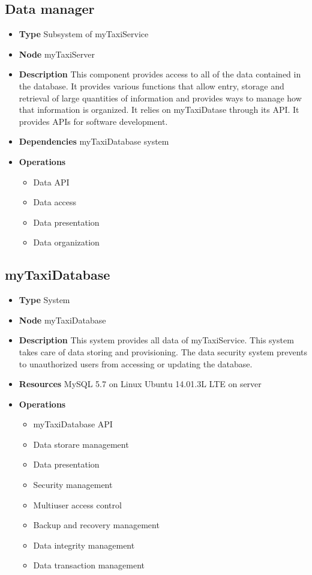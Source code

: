 \subsection{Data manager}
\begin{itemize}
	\item[]\textbf{Type} Subsystem of myTaxiService
	\item[]\textbf{Node} myTaxiServer
	\item[]\textbf{Description}  This component provides access to all of the data contained in the database. It provides various functions that allow entry, storage and retrieval of large quantities of information and provides ways to manage how that information is organized. It relies on myTaxiDatase through its API. It provides APIs for software development.
	\item[]\textbf{Dependencies} myTaxiDatabase system
	\item[]\textbf{Operations}\begin{itemize}
		\item Data API
		\item Data access
		\item Data presentation
		\item Data organization 
	\end{itemize}
\end{itemize}

\subsection{myTaxiDatabase}
\begin{itemize}
	\item[]\textbf{Type} System
	\item[]\textbf{Node} myTaxiDatabase
	\item[]\textbf{Description} This system provides all data of myTaxiService. This system takes care of data storing and provisioning. The data security system prevents to unauthorized users from accessing or updating the database.
	\item[]\textbf{Resources} MySQL 5.7 on Linux Ubuntu 14.01.3L LTE on server
	\item[]\textbf{Operations}\begin{itemize}
		\item myTaxiDatabase API
		\item Data storare management
		\item Data presentation
		\item Security management
		\item Multiuser access control
		\item Backup and recovery management
		\item Data integrity management
		\item Data transaction management		
	\end{itemize}
\end{itemize}